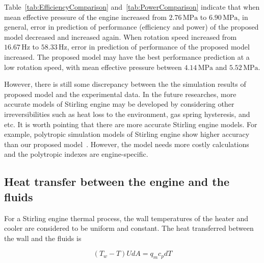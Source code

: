 \documentclass[preprint,5p, twocolumn]{elsarticle}
\begin{document}
Table~\ref{tab:EfficiencyComparison} and~\ref{tab:PowerComparison} indicate that when mean effective pressure of the engine increased from $2.76\,\mathrm{MPa}$ to $6.90\,\mathrm{MPa}$, in general, error in prediction of performance (efficiency and power) of the proposed model decreased and increased again. When rotation speed increased from $16.67\,\mathrm{Hz}$ to $58.33\,\mathrm{Hz}$, error in prediction of performance of the proposed model increased. The proposed model may have the best performance prediction at a low rotation speed, with mean effective pressure between $4.14\,\mathrm{MPa}$ and $5.52\,\mathrm{MPa}$.

However, there is still some discrepancy between the the simulation results of proposed model and the experimental data. In the future researches, more accurate models of Stirling engine may be developed by considering other irreversibilities such as heat loss to the environment, gas spring hysteresis, and etc. It is worth pointing that there are more accurate Stirling engine models. For example, polytropic simulation models of Stirling engine show higher accuracy than our proposed model~\cite{Hosseinzade2015, Babaelahi2015}. However, the model needs more costly calculations and the polytropic indexes are engine-specific.

\subsection{Heat transfer between the engine and the fluids}

For a Stirling engine thermal process, the wall temperatures of the heater and cooler are considered to be uniform and constant. The heat transferred between the wall and the fluids is

\begin{equation}
	(T_w-T)UdA = q_mc_pdT
\end{equation}
\end{document}

